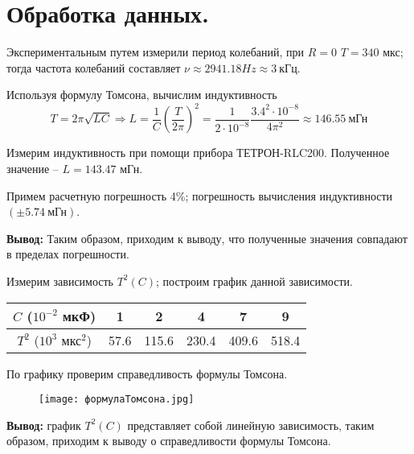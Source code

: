 	\newpage
	
	\section{Обработка данных.}
	
	\noindent Экспериментальным путем измерили период колебаний, при $R = 0$ $T = 340$ мкс; тогда частота колебаний составляет $\nu \approx 2941.18 Hz \approx 3 ~ \text{кГц} $.
	
	\hfill
	
	\noindent Используя формулу Томсона, вычислим индуктивность
	\begin{equation*}
		T = 2 \pi \sqrt{LC} \Rightarrow L = \frac{1}{C} \left(\frac{T}{2 \pi} \right)^2 = \frac{1}{2 \cdot 10^{-8}} \frac{3.4^2 \cdot 10^{-8}}{4 \pi^2} \approx 146.55 ~ \text{мГн}
	\end{equation*}
	
	\noindent Измерим индуктивность при помощи прибора ТЕТРОН-RLC200. Полученное значение -- $L = 143.47$ мГн.
	
	\noindent Примем расчетную погрешность 4\%; погрешность вычисления индуктивности $(\pm 5.74 ~ \text{мГн})$.
	
	\hfill
	
	\noindent \textbf{Вывод:} Таким образом, приходим к выводу, что полученные значения совпадают в пределах погрешности.
	
	\hfill
	
	\noindent Измерим зависимость $T^2(C)$; построим график данной зависимости.
	
	\begin{table}[h!]
		\begin{center}
			\begin{tabular}{|c|c|c|c|c|c|} \hline
				$C$ ($10^{-2}$ мкФ)   & 1     & 2      & 4      & 7      & 9 \\ \hline
				$T^2$ ($10^3$ мкс$^2$) & 57.6  & 115.6  & 230.4  & 409.6  & 518.4  \\ \hline
			\end{tabular}
		\end{center}
	\end{table}

	\noindent По графику проверим справедливость формулы Томсона.
	
	\begin{figure} [h!]
		\centering
		\texttt{[image: формулаТомсона.jpg]}
	\end{figure}

	\noindent \textbf{Вывод:} график $T^2(C)$ представляет собой линейную зависимость, таким образом, приходим к выводу о справедливости формулы Томсона.
	
